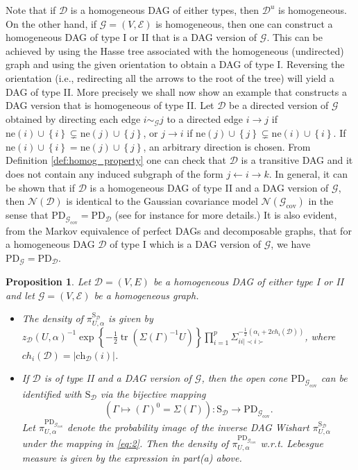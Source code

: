 \documentclass[12pt]{article}
\DeclareMathOperator{\tr}{tr}
\newcommand{\D}{\mathcal{D}}
\newcommand{\G}{\mathcal{G}}
\theoremstyle{plain}
\newtheorem{proposition}[theorem]{Proposition}
\theoremstyle{definition}
\theoremstyle{remark}
\begin{document}
Note that if $\D$ is a homogeneous DAG of either types, then $\D^{u}$ is homogeneous.
On the other hand, if $\G=(V, \mathscr{E})$ is homogeneous, then one can construct a homogeneous DAG of type I or II that is a DAG version of $\G$. This can be achieved by using the Hasse tree associated with the homogeneous (undirected) graph and using the given orientation to obtain a DAG of type I. Reversing the orientation (i.e., redirecting all the arrows to the root of the tree) will yield a DAG of type II. More precisely we shall now show an example that constructs a DAG version that is homogeneous of type II. Let $\D$ be a directed version of $\G$ obtained by directing each edge $i\sim_{\G} j$ to a directed edge  $i\rightarrow j$ if $\mathrm{ne}(i)\cup \left\{i \right\}\subsetneq \mathrm{ne}(j)\cup \left\{ j\right\}$, or $j\rightarrow i$ if $\mathrm{ne}(j)\cup\left\{ j\right\}\subsetneq \mathrm{ne}(i)\cup \left\{ i\right\}$. If $\mathrm{ne}(i)\cup \left\{i\right\}=\mathrm{ne}(j)\cup \left\{ j\right\}$, an arbitrary direction is chosen. From Definition \ref{def:homog_property} one can check that $\D$ 
is a transitive DAG and it does not contain any
induced subgraph of the form $j\leftarrow i\rightarrow k$. In general, it can be shown that if $\D$ is a homogeneous DAG of type II and a DAG version of $\G$, then $\mathscr{N}({\D})$ is identical to the Gaussian covariance model $\mathscr{N}(\G_{\mathrm{cov}})$  in the sense that $\mathrm{PD}_{\G_{\mathrm{cov}}}=\mathrm{PD}_\D$ (see \cite{pearl93*} for instance for more details.) It is also evident, from the Markov equivalence of perfect DAGs and decomposable graphs, that for a homogeneous DAG $\D$ of type I which is a DAG version of $\G$, we have $\mathrm{PD}_{\G}=\mathrm{PD}_\D.$
 \begin{proposition}\label{prop:density_SG_hom}
 Let $\D=(V, E)$ be a homogeneous DAG of either type I or II and let $\G=(V, \mathscr{E})$ be a homogeneous graph.
 \begin{itemize}
 \renewcommand{\labelitemi}{$a)$}
 \item The density of $\pi_{U,\alpha}^{\mathrm{S}_\D}$  is given by \\
 \quad \;\; $z_{\D}(U,\alpha)^{-1}\exp\left\{-\frac{1}{2}\tr(\Sigma(\Gamma)^{-1} U)\right\}\prod_{i=1}^{p} \Sigma_{ii|\prec i\succ}^ {-\frac{1}{2}(\alpha_i+2ch_{i}(\D))}$, \quad \;\; where $ch_{i}(\D)=|\mathrm{ch}_\D(i)|$.
  \renewcommand{\labelitemi}{$b)$}
 \item If $\D$ is of type II and  a DAG version of $\G$, then the open cone $\mathrm{PD}_{\G_{\mathrm{cov}}}$ can be identified with $\mathrm{S}_\D$ via the bijective mapping
\begin{equation}\label{eq:2}
\left(\Gamma\mapsto\left(\Gamma\right)^{0}=\Sigma\left(\Gamma\right)\right):\mathrm{S}_\D\rightarrow \mathrm{PD}_{\G_{\mathrm{cov}}}.
\end{equation}
\noindent Let $\pi_{U,\alpha}^{\mathrm{PD}_{\G_{\mathrm{cov}}}}$ denote the probability image of the inverse DAG Wishart $\pi_{U,\alpha}^{\mathrm{S}_\D}$ under the mapping in  \eqref{eq:2}. Then the density of  $\pi_{U,\alpha}^{\mathrm{PD}_{\G_{\mathrm{cov}}}}$ w.r.t. Lebesgue measure is given by the expression in part(a) above.
 \end{itemize}
 \end{proposition}
\end{document}
